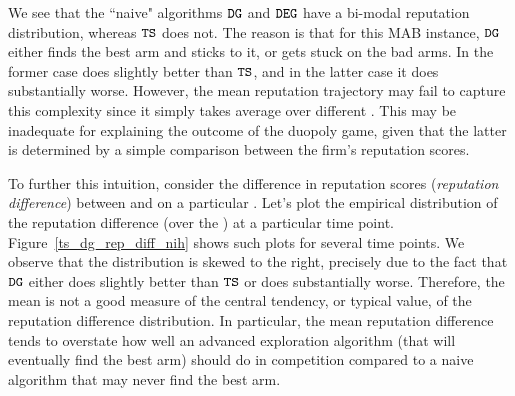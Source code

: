 \documentclass[../competing_bandits.tex]{subfiles}
\begin{document}
We see that the ``naive" algorithms $\mathtt{DG}$ and $\mathtt{DEG}$ have a bi-modal reputation distribution, whereas $\mathtt{TS}$ does not. The reason is that for this MAB instance, $\mathtt{DG}$ either finds the best arm and sticks to it, or gets stuck on the bad arms. In the former case \DG does slightly better than $\mathtt{TS}$, and in the latter case it does substantially worse. However, the mean reputation trajectory may fail to capture this complexity since it simply takes average over different \MRVs. This may be inadequate for explaining the outcome of the duopoly game, given that the latter is determined by a simple comparison between the firm's reputation scores. 

To further this intuition, consider the difference in reputation scores (\emph{reputation difference}) between \TS and \DG on a particular \MRV. Let's plot the empirical distribution of the reputation difference (over the \MRVs) at a particular time point. Figure~\ref{ts_dg_rep_diff_nih} shows such plots for several time points.
We observe that the distribution is skewed to the right, precisely due to the fact that $\mathtt{DG}$ either does slightly better than $\mathtt{TS}$ or does substantially worse. Therefore, the mean is not a good measure of the central tendency, or typical value, of the reputation difference distribution. In particular, the mean reputation difference tends to overstate how well an advanced exploration algorithm (that will eventually find the best arm) should do in competition compared to a naive algorithm that may never find the best arm.
\end{document}
